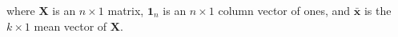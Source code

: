 \noindent where
$
\mathbf{X}
$
is an
$
n \times 1
$
matrix,
$
\mathbf{1}_{n}
$
is an
$
n \times 1
$
column vector of ones,
and 
$
\bar{\mathbf{x}}
$
is the
$
k \times 1
$
mean vector
of
$
\mathbf{X}
$.